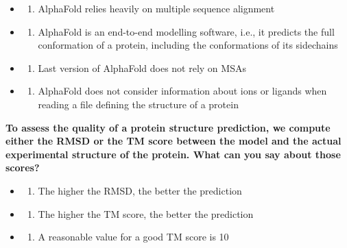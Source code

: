\documentclass[
]{scrbook}
\providecommand{\tightlist}{%
  \setlength{\itemsep}{0pt}\setlength{\parskip}{0pt}}\usepackage{longtable,booktabs,array}
\begin{document}
\begin{itemize}
\tightlist
\item
  \begin{enumerate}
  \def\labelenumi{(\Alph{enumi})}
  \tightlist
  \item
    AlphaFold relies heavily on multiple sequence alignment\\
  \end{enumerate}
\item
  \begin{enumerate}
  \def\labelenumi{(\Alph{enumi})}
  \setcounter{enumi}{1}
  \tightlist
  \item
    AlphaFold is an end-to-end modelling software, i.e., it predicts the
    full conformation of a protein, including the conformations of its
    sidechains\\
  \end{enumerate}
\item
  \begin{enumerate}
  \def\labelenumi{(\Alph{enumi})}
  \setcounter{enumi}{2}
  \tightlist
  \item
    Last version of AlphaFold does not rely on MSAs\\
  \end{enumerate}
\item
  \begin{enumerate}
  \def\labelenumi{(\Alph{enumi})}
  \setcounter{enumi}{3}
  \tightlist
  \item
    AlphaFold does not consider information about ions or ligands when
    reading a file defining the structure of a protein
  \end{enumerate}
\end{itemize}

\textbf{To assess the quality of a protein structure prediction, we
compute either the RMSD or the TM score between the model and the actual
experimental structure of the protein. What can you say about those
scores? }

\begin{itemize}
\tightlist
\item
  \begin{enumerate}
  \def\labelenumi{(\Alph{enumi})}
  \tightlist
  \item
    The higher the RMSD, the better the prediction\\
  \end{enumerate}
\item
  \begin{enumerate}
  \def\labelenumi{(\Alph{enumi})}
  \setcounter{enumi}{1}
  \tightlist
  \item
    The higher the TM score, the better the prediction\\
  \end{enumerate}
\item
  \begin{enumerate}
  \def\labelenumi{(\Alph{enumi})}
  \setcounter{enumi}{2}
  \tightlist
  \item
    A reasonable value for a good TM score is 10
  \end{enumerate}
\end{itemize}
\end{document}
